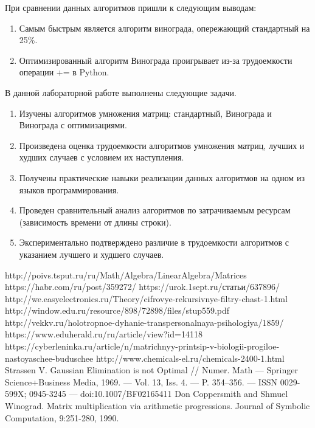 \documentclass[a4paper,14pt]{article} %
\begin{document}
	\hfill
	
	При сравнении данных алгоритмов пришли к следующим выводам:
	\begin{enumerate}
 		\item Самым быстрым  является алгоритм винограда, опережающий стандартный на 25\%. 
 		\item Оптимизированный алгоритм Винограда проигрывает из-за трудоемкости операции += в Python. 
	\end{enumerate}
	
	\hfill
	
	В данной лабораторной работе выполнены следующие задачи. 
        \begin{enumerate} 
		\item Изучены алгоритмов умножения матриц: стандартный, Винограда и Винограда с оптимизациями. 
		\item Произведена оценка трудоемкости алгоритмов умножения матриц, лучших и худших случаев с условием их наступления. 
		\item Получены практические навыки реализации данных алгоритмов на одном из языков программирования. 
		\item Проведен сравнительный анализ алгоритмов по затрачиваемым ресурсам (зависимость времени от длины строки). 
		\item Экспериментально подтверждено различие в трудоемкости алгоритмов с указанием лучшего и худшего случаев. 
	\end{enumerate}
        

 	\newpage

        \begin{thebibliography}{}
        		\bibitem{} http://poivs.tsput.ru/ru/Math/Algebra/LinearAlgebra/Matrices
		\bibitem{} https://habr.com/ru/post/359272/
		\bibitem{} https://urok.1sept.ru/статьи/637896/
		\bibitem{} http://we.easyelectronics.ru/Theory/cifrovye-rekursivnye-filtry-chast-1.html
		\bibitem{} http://window.edu.ru/resource/898/72898/files/stup559.pdf
		\bibitem{} http://vekkv.ru/holotropnoe-dyhanie-transpersonalnaya-psihologiya/1859/
		\bibitem{} https://www.eduherald.ru/ru/article/view?id=14118
		\bibitem{} https://cyberleninka.ru/article/n/matrichnyy-printsip-v-biologii-progiloe-nastoyaschee-buduschee
		\bibitem{} http://www.chemicals-el.ru/chemicals-2400-1.html
		\bibitem{} Strassen V. Gaussian Elimination is not Optimal // Numer. Math — Springer Science+Business Media, 1969. — Vol. 13, Iss. 4. — P. 354–356. — ISSN 0029-599X; 0945-3245 — doi:10.1007/BF02165411
		\bibitem{} Don Coppersmith and Shmuel Winograd. Matrix multiplication via arithmetic progressions. Journal of Symbolic Computation, 9:251-280, 1990.
	\end{thebibliography} 
\end{document}
